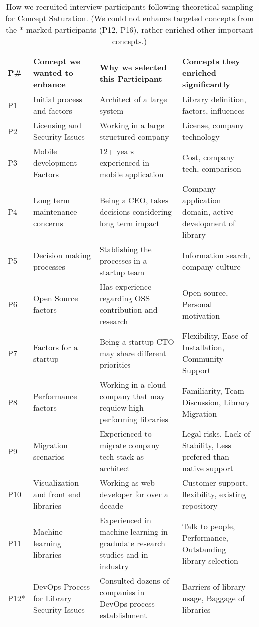 \begin{table*}[]
    \centering
    \caption{How we recruited interview participants following theoretical sampling for Concept Saturation. (We could not enhance targeted concepts from the *-marked participants (P12, P16), rather enriched other important concepts.)}
    \begin{tabular}{p{.4cm}p{4cm}p{6cm}p{6cm}}%
    \toprule
    P\# & Concept we wanted to enhance & Why we selected this Participant & Concepts they enriched significantly \\ 
    \midrule
P1 & Initial process and factors & Architect of a large system & Library definition, factors, influences \\ 
P2 & Licensing and Security Issues & Working in a large structured company & License, company technology \\ 
P3 & Mobile development Factors & 12+ years experienced in mobile application & Cost, company tech, comparison  \\ 
P4 & Long term maintenance concerns & Being a CEO, takes decisions considering long term impact & Company application domain, active development of library \\ 
P5 & Decision making processes & Stablishing the processes in a startup team & Information search, company culture \\ 
P6 & Open Source factors & Has experience regarding OSS contribution and research & Open source, Personal motivation \\ 
P7 & Factors for a startup & Being a startup CTO may share different priorities & Flexibility, Ease of Installation, Community Support \\ 
P8 & Performance factors & Working in a cloud company that may requiew high performing libraries & Familiarity, Team Discussion, Library Migration \\ 
P9 & Migration scenarios & Experienced to migrate company tech stack as architect & Legal risks, Lack of Stability, Less prefered than native support \\ 
P10 & Visualization and front end libraries & Working as web developer for over a decade & Customer support, flexibility, existing repository \\ 
P11 & Machine learning libraries & Experienced in machine learning in gradudate research studies and in industry & Talk to people, Performance, Outstanding library selection \\ 
P12* & DevOps Process for Library Security Issues & Consulted dozens of companies in DevOps process establishment & Barriers of library usage, Baggage of libraries \\ 

\end{tabular}
\end{table*}
